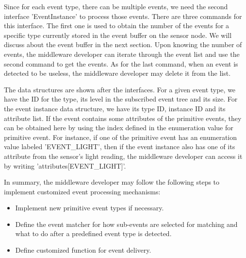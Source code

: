 Since for each event type, there can be multiple events, we need the second interface 'EventInstance' to process those events. There are three commands for this interface. The first one is used to obtain the number of the events for a specific type currently stored in the event buffer on the sensor node. We will discuss about the event buffer in the next section. Upon knowing the number of events, the middleware developer can iterate through the event list and use the second command to get the events. As for the last command, when an event is detected to be useless, the middleware developer may delete it from the list.

The data structures are shown after the interfaces. For a given event type, we have the ID for the type, its level in the subscribed event tree and its size. For the event instance data structure, we have its type ID, instance ID and its attribute list. If the event contains some attributes of the primitive events, they can be obtained here by using the index defined in the enumeration value for primitive event. For instance, if one of the primitive event has an enumeration value labeled 'EVENT\_LIGHT', then if the event instance also has one of its attribute from the sensor's light reading, the middleware developer can access it by writing 'attributes[EVENT\_LIGHT]'.

In summary, the middleware developer may follow the following steps to implement customized event processing mechanisms:
\begin{itemize} 
\item Implement new primitive event types if necessary.
\item Define the event matcher for how sub-events are selected for matching and what to do after a predefined event type is detected.
\item Define customized function for event delivery.
\end{itemize}